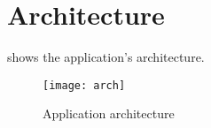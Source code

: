 \chapter{Architecture}\label{ch:arch}

 shows the application's architecture.

\begin{figure}[htb]
	\centering
	\texttt{[image: arch]}
	\caption{Application architecture}\label{fig:arch}
\end{figure}




